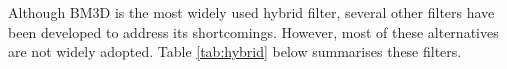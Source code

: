 Although \gls{BM3D} is the most widely used hybrid filter, several other filters have been developed to address its shortcomings. However, most of these alternatives are not widely adopted. Table \ref{tab:hybrid} below summarises these filters.


